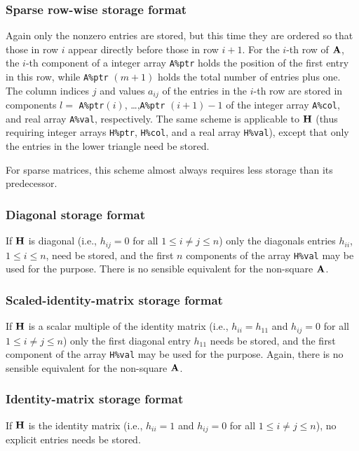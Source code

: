 \documentclass{galahad}
\begin{document}
\subsubsection{Sparse row-wise storage format}\label{rowwise}
Again only the nonzero entries are stored, but this time
they are ordered so that those in row $i$ appear directly before those
in row $i+1$. For the $i$-th row of ${\mathbf{A}}$, the $i$-th component of a 
integer array {\tt A\%ptr} holds the position of the first entry in this row,
while {\tt A\%ptr} $(m+1)$ holds the total number of entries plus one.
The column indices $j$ and values $a_{ij}$ of the entries in the $i$-th row 
are stored in components 
$l =$ {\tt A\%ptr}$(i)$, \ldots ,{\tt A\%ptr} $(i+1)-1$ of the 
integer array {\tt A\%col}, and real array {\tt A\%val}, respectively. 
The same scheme is applicable to
${\mathbf{H}}$ (thus requiring integer arrays {\tt H\%ptr}, {\tt H\%col}, and 
a real array {\tt H\%val}),
except that only the entries in the lower triangle need be stored.

For sparse matrices, this scheme almost always requires less storage than 
its predecessor.

\subsubsection{Diagonal storage format}\label{diagonal}
If ${\mathbf{H}}$ is diagonal (i.e., $h_{ij} = 0$ for all $1 \leq i \neq j \leq n$)
only the diagonals entries $h_{ii}$, $1 \leq i \leq n$,  need be stored,
and the first $n$ components of the array {\tt H\%val} may be used for 
the purpose. There is no sensible equivalent for the non-square ${\mathbf{A}}$.

\subsubsection{Scaled-identity-matrix storage format}\label{scaled-identity}
If ${\mathbf{H}}$ is a scalar multiple of the identity matrix
(i.e., $h_{ii} = h_{11}$  and $h_{ij} = 0$ for all $1 \leq i \neq j \leq n$)
only the first diagonal entry $h_{11}$ needs be stored,
and the first component of the array {\tt H\%val} may be used for
the purpose. Again, there is no sensible equivalent for the non-square ${\mathbf{A}}$.

\subsubsection{Identity-matrix storage format}\label{identity}
If ${\mathbf{H}}$ is the identity matrix
(i.e., $h_{ii} = 1$ and $h_{ij} = 0$ for all $1 \leq i \neq j \leq n$),
no explicit entries needs be stored.
\end{document}
